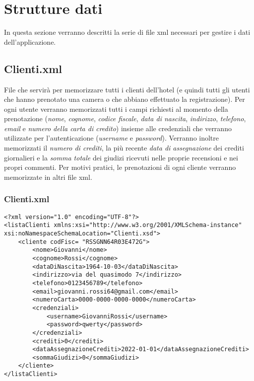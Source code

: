 \documentclass [a4paper, 12pt]{book}
\begin{document}
\medskip
\medskip

\section{Strutture dati}
In questa sezione verranno descritti la serie di file xml necessari per gestire i dati dell'applicazione.

\subsection{Clienti.xml}
File che servirà per memorizzare tutti i clienti dell'hotel (e quindi tutti gli utenti che hanno prenotato una camera o che abbiano effettuato la registrazione). Per ogni utente verranno memorizzati tutti i campi richiesti al momento della prenotazione (\textit{nome}, \textit{cognome}, \textit{codice fiscale}, \textit{data di nascita}, \textit{indirizzo}, \textit{telefono}, \textit{email} e \textit{numero della carta di credito}) insieme alle credenziali che verranno utilizzate per l'autenticazione (\textit{username} e \textit{password}). Verranno inoltre memorizzati il \textit{numero di crediti}, la più recente \textit{data di assegnazione} dei crediti giornalieri e la \textit{somma totale} dei giudizi ricevuti nelle proprie recensioni e nei propri commenti. Per motivi pratici, le prenotazioni di ogni cliente verranno memorizzate in altri file xml.
\subsubsection{Clienti.xml}
\begin{lstlisting}[style=XML]
<?xml version="1.0" encoding="UTF-8"?>
<listaClienti xmlns:xsi="http://www.w3.org/2001/XMLSchema-instance" xsi:noNamespaceSchemaLocation="Clienti.xsd">
    <cliente codFisc= "RSSGNN64R03E472G">
        <nome>Giovanni</nome>
        <cognome>Rossi</cognome>
        <dataDiNascita>1964-10-03</dataDiNascita>
        <indirizzo>via del quasimodo 7</indirizzo>
        <telefono>0123456789</telefono>
        <email>giovanni.rossi64@gmail.com</email>
        <numeroCarta>0000-0000-0000-0000</numeroCarta>
        <credenziali>
            <username>GiovanniRossi</username>
            <password>qwerty</password>
        </credenziali>
        <crediti>0</crediti>
        <dataAssegnazioneCrediti>2022-01-01</dataAssegnazioneCrediti>
        <sommaGiudizi>0</sommaGiudizi>
    </cliente>
</listaClienti>


\end{lstlisting}
\end{document}
